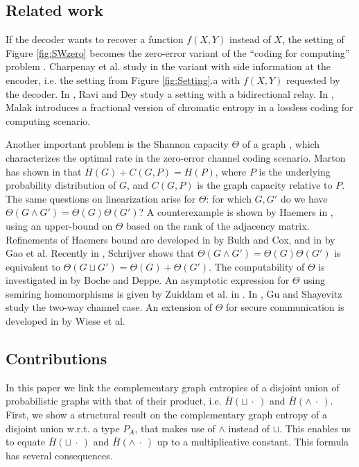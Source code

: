 \documentclass[conference,a4paper]{IEEEtran}
\begin{document}
\subsection{Related work}

If the decoder wants to recover a function $f(X,Y)$ instead of $X$, the setting of Figure \ref{fig:SWzero} becomes the zero-error variant of the ``coding for computing'' problem \cite{orlitsky1995coding}. Charpenay et al. study in \cite{charpenay2022zero} the variant with side information at the encoder, i.e. the setting from Figure \ref{fig:Setting}.a with $f(X,Y)$ requested by the decoder. In \cite{ravi2015zero}, Ravi and Dey study a setting with a bidirectional relay. In \cite{malak2022fractional}, Malak introduces a fractional version of chromatic entropy in a lossless coding for computing scenario.

Another important problem is the Shannon capacity $\Theta$ of a graph \cite{shannon1956zero}, which characterizes the optimal rate in the zero-error channel coding scenario. Marton has shown in \cite{marton1993shannon} that $\overline{H}(G) + C(G,P) = H(P)$, where $P$ is the underlying probability distribution of $G$, and $C(G,P)$ is the graph capacity relative to $P$. %
The same questions on linearization arise for $\Theta$: for which $G,G'$ do we have $\Theta(G \wedge G') = \Theta(G) \Theta(G')$? A counterexample is shown by Haemers in \cite{haemers1979some}, using an upper-bound on $\Theta$ based on the rank of the adjacency matrix. Refinements of Haemers bound are developed in \cite{bukh2018fractional} by Bukh and Cox, and in \cite{gao2022tracial} by Gao et al. Recently in \cite{schrijver2023shannon}, Schrijver shows that $\Theta(G \wedge G') = \Theta(G) \Theta(G')$ is equivalent to $\Theta(G \sqcup G') = \Theta(G) + \Theta(G')$. The computability of $\Theta$ is investigated in \cite{boche2021computability} by Boche and Deppe. An asymptotic expression for $\Theta$ using semiring homomorphisms is given by Zuiddam et al. in \cite{zuiddam2018algebraic}. In \cite{gu2021non}, Gu and Shayevitz study the two-way channel case. An extension of $\Theta$ for secure communication is developed in \cite{wiese2018secure} by Wiese et al. 

\subsection{Contributions}

In this paper we link the complementary graph entropies of a disjoint union of probabilistic graphs with that of their product, i.e. $\overline{H}(\sqcup \:\cdot\:)$ and $\overline{H}(\wedge \:\cdot\:)$. 
First, we show a structural result on the complementary graph entropy of a disjoint union w.r.t. a type $P_A$, that makes use of $\wedge$ instead of $\sqcup$. This enables us to equate $\overline{H}(\sqcup \:\cdot\:)$ and $\overline{H}(\wedge \:\cdot\:)$ up to a multiplicative constant. This formula has several consequences.
\end{document}
